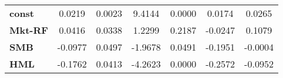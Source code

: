 \begin{center}
\begin{tabular}{lcccccc}
\midrule
\textbf{const}  &       0.0219       &       0.0023       &      9.4144     &      0.0000      &       0.0174      &       0.0265       \\
\textbf{Mkt-RF} &       0.0416       &       0.0338       &      1.2299     &      0.2187      &      -0.0247      &       0.1079       \\
\textbf{SMB}    &      -0.0977       &       0.0497       &     -1.9678     &      0.0491      &      -0.1951      &      -0.0004       \\
\textbf{HML}    &      -0.1762       &       0.0413       &     -4.2623     &      0.0000      &      -0.2572      &      -0.0952       \\
\bottomrule
\end{tabular}
\end{center}
